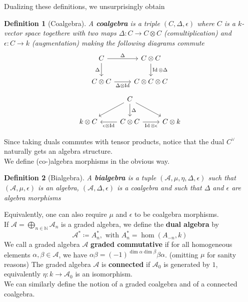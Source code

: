 \documentclass[11pt, a4paper]{article}
\DeclareMathOperator*{\id}{Id}
\newtheorem{defn}{Definition}
\theoremstyle{plain}
\begin{document}
Dualizing these definitions, we unsurprisingly obtain
\begin{defn}[Coalgebra]
	A \textbf{coalgebra} is a triple $( C,\Delta,\epsilon) $ where $C$ is a $k$-vector space togethere with two maps $\Delta\colon C \to C \otimes C$ (comultiplication) and $\epsilon\colon C \to k$ (augmentation) making the following diagrams commute
\[\begin{tikzcd}
	C & {C\otimes C} \\
	{C\otimes C} & {C\otimes C \otimes C}
	\arrow["\Delta", from=1-1, to=1-2]
	\arrow["{\id \otimes \Delta}", from=1-2, to=2-2]
	\arrow["{\Delta \otimes \id}"', from=2-1, to=2-2]
	\arrow["\Delta"', from=1-1, to=2-1]
\end{tikzcd}\]
\[\begin{tikzcd}
	& C \\
	{k\otimes C} & {C\otimes C} & {C\otimes k}
	\arrow["\Delta", from=1-2, to=2-2]
	\arrow[from=1-2, to=2-1]
	\arrow[from=1-2, to=2-3]
	\arrow["{\id \otimes \epsilon}"', from=2-2, to=2-3]
	\arrow["{\epsilon \otimes \id}", from=2-2, to=2-1]
\end{tikzcd}\]
\end{defn}
Since taking duals commutes with tensor products, notice that the dual  $C^{\vee}$ naturally gets an algebra structure.\\
We define (co-)algebra morphisms in the obvious way.
\begin{defn}[Bialgebra]
	A \textbf{bialgebra} is a tuple $( \mathcal{A}, \mu, \eta, \Delta, \epsilon) $ such that $( \mathcal{A}, \mu,\epsilon)$ is an algebra, $( \mathcal{A}, \Delta, \epsilon) $ is a coalgebra and such that $\Delta$ and $\epsilon$ are algebra morphisms
\end{defn}
Equivalently, one can also require $\mu$ and $\epsilon$ to be coalgebra morphisms.\\
If $\mathcal{A}= \bigoplus_{n \in \mathbb{N}}  \mathcal{A}_n$ is a graded algebra, we define the \textbf{dual algebra} by
\[ 
\mathcal{A}^{\ast} \coloneq A_n^{\ast}, \text{ with } A_n^{\ast}=\hom( A_{-n} , k) 
\]
We call a graded algebra $\mathcal{A}$ \textbf{graded commutative} if for all homogeneous elements $\alpha,\beta \in \mathcal{A}$, we have $\alpha \beta= (-1)^{\dim \alpha\dim\beta}\beta \alpha$. (omitting $\mu$ for sanity reasons)
The graded algebra $\mathcal{A}$ is \textbf{connected} if $\mathcal{A}_0$ is generated by $1$, equivalently $\eta\colon k \to \mathcal{A}_0$ is an isomorphism.\\
We can similarly define the notion of a  graded coalgebra and of a connected coalgebra.
\end{document}
